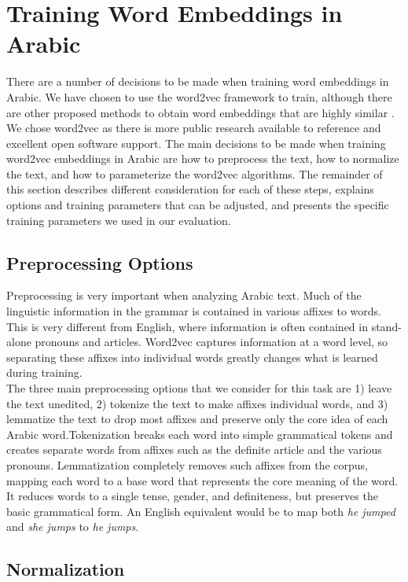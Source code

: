 \section{Training Word Embeddings in Arabic}
\label{sec:training}

There are a number of decisions to be made when training word embeddings in Arabic. We have chosen to use the word2vec framework to train, although there are other proposed methods to obtain word embeddings that are highly similar \cite{pennington2014glove}. We chose word2vec as there is more public research available to reference and excellent open software support. The main decisions to be made when training word2vec embeddings in Arabic are how to preprocess the text, how to normalize the text, and how to parameterize the word2vec algorithms. The remainder of this section describes different consideration for each of these steps, explains options and training parameters that can be adjusted, and presents the specific training parameters we used in our evaluation.

\subsection{Preprocessing Options}

Preprocessing is very important when analyzing Arabic text. Much of the linguistic information in the grammar is contained in various affixes to words. This is very different from English, where information is often contained in stand-alone pronouns and articles. Word2vec captures information at a word level, so separating these affixes into individual words greatly changes what is learned during training.
\\
The three main preprocessing options that we consider for this task are 1) leave the text unedited, 2) tokenize the text to make affixes individual words, and 3) lemmatize the text to drop most affixes and preserve only the core idea of each Arabic word.Tokenization breaks each word into simple grammatical tokens and creates separate words from affixes such as the definite article and the various pronouns. Lemmatization completely removes such affixes from the corpus, mapping each word to a base word that represents the core meaning of the word. It reduces words to a single tense, gender, and definiteness, but preserves the basic grammatical form. An English equivalent would be to map both \textit{he jumped} and \textit{she jumps} to \textit{he jumps}.

\subsection{Normalization}

